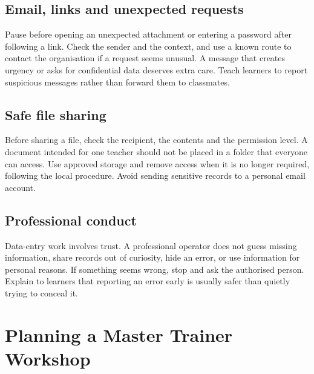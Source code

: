 \documentclass[11pt,openany,oneside]{book}
\begin{document}
\section{Email, links and unexpected requests}
Pause before opening an unexpected attachment or entering a password after following a link. Check the sender and the context, and use a known route to contact the organisation if a request seems unusual. A message that creates urgency or asks for confidential data deserves extra care. Teach learners to report suspicious messages rather than forward them to classmates.
\section{Safe file sharing}
Before sharing a file, check the recipient, the contents and the permission level. A document intended for one teacher should not be placed in a folder that everyone can access. Use approved storage and remove access when it is no longer required, following the local procedure. Avoid sending sensitive records to a personal email account.
\section{Professional conduct}
Data-entry work involves trust. A professional operator does not guess missing information, share records out of curiosity, hide an error, or use information for personal reasons. If something seems wrong, stop and ask the authorised person. Explain to learners that reporting an error early is usually safer than quietly trying to conceal it.

\chapter{Planning a Master Trainer Workshop}
\end{document}
